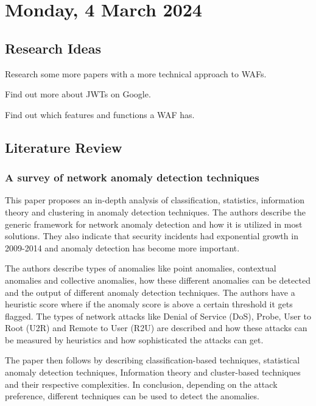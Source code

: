 \pendsign

\section[2024/03/04]{Monday, 4 March 2024}

\subsection{Research Ideas}

\begin{compactitem}
\item Research some more papers with a more technical approach to WAFs.
\item Find out more about JWTs on Google.
\item Find out which features and functions a WAF has.
\end{compactitem}


\subsection{Literature Review}
\subsubsection{A survey of network anomaly detection techniques \cite{AHMED201619}}
This paper proposes an in-depth analysis of classification, statistics, information theory and clustering in anomaly detection techniques. The authors describe the generic framework for network anomaly detection and how it is utilized in most solutions. They also indicate that security incidents had exponential growth in 2009-2014 and anomaly detection has become more important.

The authors describe types of anomalies like point anomalies, contextual anomalies and collective anomalies, how these different anomalies can be detected and the output of different anomaly detection techniques. The authors have a heuristic score where if the anomaly score is above a certain threshold it gets flagged. The types of network attacks like Denial of Service (DoS), Probe, User to Root (U2R) and Remote to User (R2U) are described and how these attacks can be measured by heuristics and how sophisticated the attacks can get.

The paper then follows by describing classification-based techniques, statistical anomaly detection techniques, Information theory and cluster-based techniques and their respective complexities. In conclusion, depending on the attack preference, different techniques can be used to detect the anomalies.

